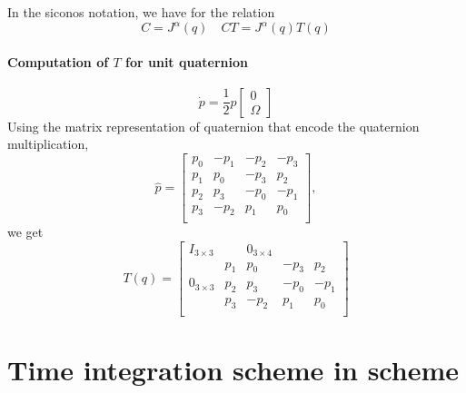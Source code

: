 In the siconos notation, we have for the relation
\begin{equation}
  \label{eq:2}
   C =   J^\alpha(q) \quad CT = J^\alpha(q)T(q)
\end{equation}

\paragraph{Computation of $T$ for unit quaternion}
\begin{equation}
  \label{eq:3}
  \dot p = \frac  1 2 p 
  \begin{bmatrix}
    0 \\
    \Omega
  \end{bmatrix}
\end{equation}
Using the matrix representation of quaternion that encode the quaternion multiplication,
\begin{equation}
  \label{eq:4}
   \hat p = \begin{bmatrix}
     p_0 & -p_1 & -p_2 & -p_3 \\
     p_1 & p_0 & -p_3 & p_2 \\
     p_2 & p_3 & -p_0 & -p_1 \\
     p_3 & -p_2 & p_1 & p_0 \\
   \end{bmatrix},
\end{equation}
we get
\begin{equation}
  T(q)=\label{eq:5}
  \begin{bmatrix}
    I_{3\times 3} & & 0_{3\times 4} & \\
    &   p_1 & p_0 & -p_3 & p_2 \\
    0_{3\times 3} &   p_2 & p_3 & -p_0 & -p_1 \\
    &   p_3 & -p_2 & p_1 & p_0 \\
  \end{bmatrix}
\end{equation}




\section{Time integration scheme in scheme}



